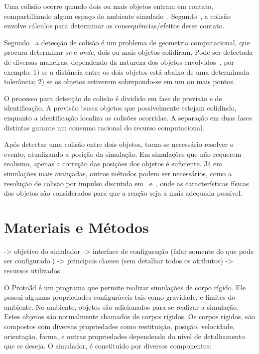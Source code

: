 \documentclass[12pt]{article}
\begin{document}
Uma colisão ocorre quando dois ou mais objetos entram em contato, compartilhando algum espaço do ambiente simulado~\cite{ericson2004real}. Segundo~\cite{bourg2013physics}, a colisão envolve cálculos para determinar as consequências/efeitos desse contato.

Segundo~\cite{bourg2013physics} a detecção de colisão é um problema de geometria computacional, que procura determinar \emph{se} e \emph{onde}, dois ou mais objetos colidiram. Pode ser detectada de diversas maneiras, dependendo da natureza dos objetos envolvidos~\cite{foley1996}, por exemplo: 1) se a distância entre os dois objetos está abaixo de uma determinada tolerância; 2) se os objetos estiverem sobrepondo-se em um ou mais pontos.

O processo para detecção de colisão é dividido em fase de previsão e de identificação. A previsão busca objetos que possivelmente estejam colidindo, enquanto a identificação localiza as colisões ocorridas. A separação em duas fases distintas garante um consumo racional do recurso computacional. 

Após detectar uma colisão entre dois objetos, torna-se necessário resolver o evento, atualizando a posição da simulação. Em simulações que não requerem realismo, apenas a correção das posições dos objetos é suficiente. Já em simulações mais avançadas, outros métodos podem ser necessários, como a resolução de colisão por impulso discutida em~\cite{bourg2013physics} e~\cite{baraff1992dynamic}, onde as características físicas dos objetos são considerados para que a reação seja a mais adequada possível.

\section{Materiais e Métodos}
-> objetivo do simulador
-> interface de configuração (falar somente do que pode ser configurado.)
-> principais classes (sem detalhar todos os atributos)
-> recursos utilizados


O Proto3d é um programa que permite realizar simulações de corpo rígido.
Ele possui algumas propriedades configuráveis tais como gravidade, e limites do ambiente.
No ambiente, objetos são adicionados para se realizar a simulação. Estes objetos são normalmente chamados de corpos rígidos.
Os corpos rígidos, são compostos com diversas propriedades como restituição, posição, velocidade, orientação, forma, e outras propriedades dependendo do nível de detalhamento que se deseja.
O simulador, é constituído  por diversos componentes:
\end{document}
